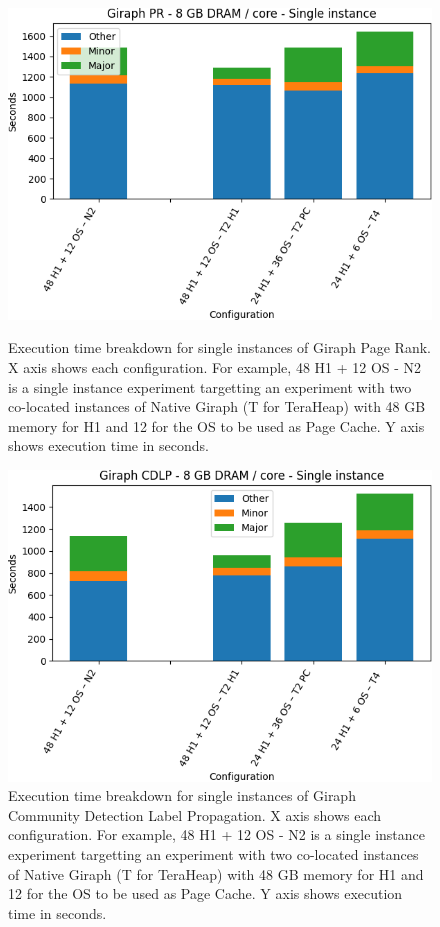 \begin{figure}[thbp]
        \centering
    \includegraphics[width=\linewidth]{./fig/g_pr128_single.png}
    \caption{Execution time breakdown for single instances of Giraph
    Page Rank. X axis shows each configuration.
        For example, 48 H1 + 12 OS - N2 is a single instance experiment targetting an experiment with two co-located instances of Native Giraph (T for TeraHeap) with 48 GB memory for H1 and 12 for the OS to be used as Page Cache. Y axis shows execution time in seconds.}
    \label{fig:g_pr128_single}
    \includegraphics[width=\linewidth]{./fig/g_cdlp128_single.png}
    \caption{Execution time breakdown for single instances of Giraph
    Community Detection Label Propagation. X axis shows each configuration.
        For example, 48 H1 + 12 OS - N2 is a single instance experiment targetting an experiment with two co-located instances of Native Giraph (T for TeraHeap) with 48 GB memory for H1 and 12 for the OS to be used as Page Cache. Y axis shows execution time in seconds.}
    \label{fig:g_cdlp128_single}
\end{figure}

